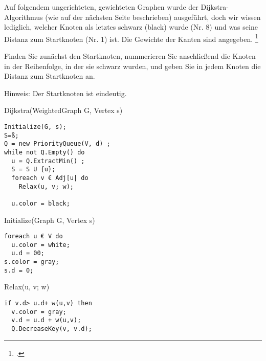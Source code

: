 \documentclass{bschlangaul-aufgabe}
\begin{document}

Auf folgendem ungerichteten, gewichteten Graphen wurde der
Dijkstra-Algorithmus (wie auf der nächsten Seite beschrieben)
ausgeführt, doch wir wissen lediglich, welcher Knoten als letztes
schwarz (black) wurde (Nr. 8) und was seine Distanz zum Startknoten (Nr.
1) ist. Die Gewichte der Kanten sind angegeben.
\footcite{examen:66115:2015:03}

Finden Sie zunächst den Startknoten, nummerieren Sie anschließend die
Knoten in der Reihenfolge, in der sie schwarz wurden, und geben Sie in
jedem Knoten die Distanz zum Startknoten an.

Hinweis: Der Startknoten ist eindeutig.

Dijkstra(WeightedGraph G, Vertex s)

\begin{verbatim}
Initialize(G, s);
S=ß;
Q = new PriorityQueue(V, d) ;
while not Q.Empty() do
  u = Q.ExtractMin() ;
  S = S U {u};
  foreach v € Adj[u| do
    Relax(u, v; w);

  u.color = black;
\end{verbatim}

Initialize(Graph G, Vertex s)

\begin{verbatim}
foreach u € V do
  u.color = white;
  u.d = 00;
s.color = gray;
s.d = 0;
\end{verbatim}

Relax(u, v; w)

\begin{verbatim}
if v.d> u.d+ w(u,v) then
  v.color = gray;
  v.d = u.d + w(u,v);
  Q.DecreaseKey(v, v.d);
\end{verbatim}
\end{document}
